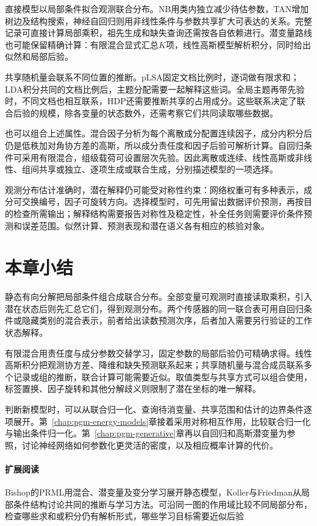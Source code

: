 直接模型以局部条件拟合观测联合分布。NB用类内独立减少待估参数，TAN增加树边及结构搜索，神经自回归则用非线性条件与参数共享扩大可表达的关系。完整记录可直接计算局部乘积，祖先生成和缺失查询还需按各自依赖进行。潜变量路线也可能保留精确计算：有限混合显式汇总$K$项，线性高斯模型解析积分，同时给出似然和局部后验。

共享随机量会联系不同位置的推断。pLSA固定文档比例时，逐词做有限求和；LDA积分共同的文档比例后，主题分配需要一起解释这些词。全局主题再带先验时，不同文档也相互联系，HDP还需要推断共享的占用成分。这些联系决定了联合后验的规模，除各变量的状态数外，还需考察它们共同读取哪些数据。

也可以组合上述属性。混合因子分析为每个离散成分配置连续因子，成分内积分后仍是低秩加对角协方差的高斯，所以成分责任度和因子后验可解析计算。自回归条件可采用有限混合，组级载荷可设置层次先验。因此离散或连续、线性高斯或非线性、组间共享或独立、逐项生成或联合生成，分别描述模型的一项选择。

观测分布估计准确时，潜在解释仍可能受对称性约束：网络权重可有多种表示，成分可交换编号，因子可旋转方向。选择模型时，可先用留出数据评价预测，再按目的检查所需输出；解释结构需要报告对称性及稳定性，补全任务则需要评价条件预测和误差范围。似然计算、预测表现和潜在语义各有相应的核验对象。

\section{本章小结}
\label{sec:pgm-static-directed-summary}

静态有向分解把局部条件组合成联合分布。全部变量可观测时直接读取乘积，引入潜在状态后则先汇总它们，得到观测分布。两个传感器的同一联合表可用自回归条件或隐藏类别的混合表示，前者给出读数预测次序，后者加入需要另行验证的工作状态解释。

有限混合用责任度与成分参数交替学习，固定参数的局部后验仍可精确求得。线性高斯积分把观测协方差、降维和缺失预测联系起来；共享随机量与混合成员联系多个记录或组的推断，联合计算可能需要近似。取值类型与共享方式可以组合使用，标签置换、因子旋转和其他分解歧义则限制了潜在坐标的唯一解释。

判断新模型时，可以从联合归一化、查询待消变量、共享范围和估计的边界条件逐项展开。第~\ref{chap:pgm-energy-models}章接着采用对称相互作用，比较联合归一化与输出条件归一化。第~\ref{chap:pgm-generative}章再以自回归和高斯潜变量为参照，讨论神经网络如何参数化更灵活的密度，以及相应概率计算的代价。

\paragraph{扩展阅读}
Bishop的PRML用混合、潜变量及变分学习展开静态模型，Koller与Friedman从局部条件结构讨论共同的推断与学习方法。可沿同一图的作用域比较不同局部分布，检查哪些求和或积分仍有解析形式，哪些学习目标需要近似后验
